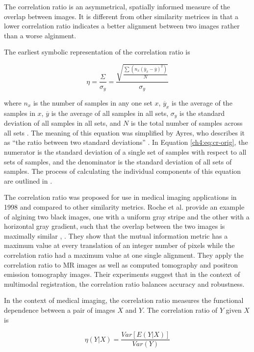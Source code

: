 The correlation ratio is an asymmetrical, spatially informed measure of the overlap between images. It is different from other similarity metrices in that a lower correlation ratio indicates a better alignment between two images rather than a worse alginment. 

The earliest symbolic representation of the correlation ratio is 

\begin{equation}
\label{ch4:eq:cr-orig}
\eta = \frac{\Sigma}{\sigma_y} = \frac{\sqrt{\frac{\sum(n_x(\overline{y}_x - \overline{y})^2)}{N}}}{\sigma_y}
\end{equation}

where $n_x$ is the number of samples in any one set $x$, $\overline{y}_x$ is the average of the samples in $x$, $\overline{y}$ is the average of all samples in all sets, $\sigma_y$ is the standard deviation of all samples in all sets, and $N$ is the total number of samples across all sets \cite{Rugg1917}. The meaning of this equation was simplified by Ayres, who describes it as ``the ratio between two standard deviations'' \cite{Ayres1920}. In Equation \ref{ch4:eq:cr-orig}, the numerator is the standard deviation of a single set of samples with respect to all sets of samples, and the denominator is the standard deviation of all sets of samples. The process of calculating the individual components of this equation are outlined in \cite{Rugg1917}.

The correlation ratio was proposed for use in medical imaging applications in 1998 and compared to other similarity metrics. Roche et al. provide an example of algining two black images, one with a uniform gray stripe and the other with a horizontal gray gradient, such that the overlap between the two images is maximally similar \cite{Roche1998a}, \cite{Roche1998}. They show that the mutual information metric has a maximum value at every translation of an integer number of pixels while the correlation ratio had a maximum value at one single alignment. They apply the correlation ratio to MR images as well as computed tomography and positron emission tomography images. Their experiments suggest that in the context of multimodal registration, the correlation ratio balances accuracy and robustness.

In the context of medical imaging, the correlation ratio measures the functional dependence between a pair of images $X$ and $Y$. The correlation ratio of $Y$ given $X$ is

\begin{equation}
\eta(Y|X) = \frac{Var[E(Y|X)]}{Var(Y)}
\end{equation}

